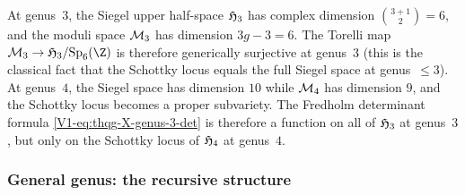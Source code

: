 \begin{remark}%
%
At genus~$3$, the Siegel upper half-space $\mathfrak{H}_3$ has
complex dimension $\binom{3+1}{2} = 6$, and the moduli space
$\mathcal{M}_3$ has dimension $3g-3 = 6$. The Torelli map
$\cM_3 \to \Siegel_3/\Sp_6(\Z)$ is therefore generically
surjective at genus~$3$ (this is the classical fact that the
Schottky locus equals the full Siegel space at genus~$\leq 3$).
At genus~$4$, the Siegel space has dimension $10$ while $\mathcal{M}_4$
has dimension $9$, and the Schottky locus becomes a proper
subvariety. The Fredholm determinant formula
\eqref{V1-eq:thqg-X-genus-3-det} is therefore a function on all of
$\mathfrak{H}_3$ at genus~$3$, but only on the Schottky locus of
$\mathfrak{H}_4$ at genus~$4$.
\end{remark}

\subsubsection{General genus: the recursive structure}

